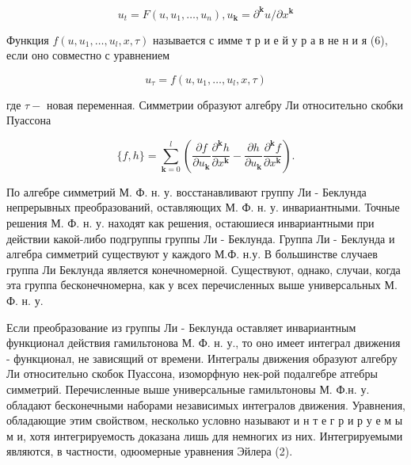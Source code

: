 \documentclass[10pt]{article}
\begin{document}
\[

u_{t}=F\left(u, u_{1}, \ldots, u_{n}\right), u_{\mathbf{k}}=\partial^{\mathbf{k}} u / \partial x^{\mathbf{k}}

\]



Функция $f\left(u, u_{1}, \ldots, u_{l}, x, \tau\right)$ называется с имме т р и е й у р а в не н и я (6), если оно совместно с уравнением



\[

u_{\tau}=f\left(u, u_{1}, \ldots, u_{l}, x, \tau\right)

\]



где $\tau-$ новая переменная. Симметрии образуют алгебру Ли относительно скобки Пуассона



\[

\{f, h\}=\sum_{\mathbf{k}=0}^{l}\left(\frac{\partial f}{\partial u_{\mathbf{k}}} \frac{\partial^{\mathbf{k}} h}{\partial x^{\mathbf{k}}}-\frac{\partial h}{\partial u_{\mathbf{k}}} \frac{\partial^{\mathbf{k}} f}{\partial x^{\mathbf{k}}}\right) .

\]



По алгебре симметрий М. Ф. н. у. восстанавливают группу Ли - Беклунда непрерывных преобразований, оставляющих М. Ф. н. у. инвариантными. Точные решения М. Ф. н. у. находят как решения, остаюшиеся инвариантными при действии какой-либо подгруппы группы Ли - Беклунда. Группа Ли - Беклунда и алгебра симметрий существуют у каждого М.Ф. н.у. В большинстве случаев группа Ли Беклунда является конечномерной. Существуют, однако, случаи, когда эта группа бесконечномерна, как у всех перечисленных выше универсальных М. Ф. н. у.



Если преобразование из группы Ли - Беклунда оставляет инвариантным функционал действия гамильтонова М. Ф. н. у., то оно имеет интеграл движения - функционал, не зависящий от времени. Интегралы движения образуют алгебру Ли относительно скобок Пуассона, изоморфную нек-рой подалгебре атгебры симметрий. Перечисленные выше универсальные гамильтоновы М. Ф.н. у. обладают бесконечными наборами независимых интегралов движения. Уравнения, обладающие этим свойством, несколько условно называют и н т е г р и р у е м ы м и, хотя интегрируемость доказана лишь для немногих из них. Интегрируемыми являются, в частности, одюомерные уравнения Эйлера (2).
\end{document}
